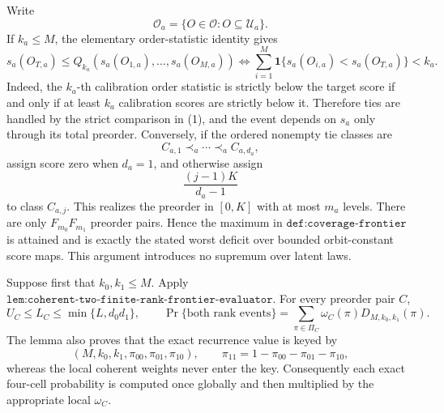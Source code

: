 Write
\[
\mathcal O_a=\{O\in\mathcal O:O\subseteq\mathcal U_a\}.
\]
If \(k_a\le M\), the elementary order-statistic identity gives
\[
s_a(O_{T,a})\le Q_{k_a}(s_a(O_{1,a}),\ldots,s_a(O_{M,a}))
\iff
\sum_{i=1}^M\mathbf 1\{s_a(O_{i,a})<s_a(O_{T,a})\}<k_a.
\tag{1}
\]
Indeed, the \(k_a\)-th calibration order statistic is strictly below the target score if and only if at least \(k_a\) calibration scores are strictly below it. Therefore ties are handled by the strict comparison in (1), and the event depends on \(s_a\) only through its total preorder. Conversely, if the ordered nonempty tie classes are
\[
C_{a,1}\prec_a\cdots\prec_a C_{a,d_a},
\]
assign score zero when \(d_a=1\), and otherwise assign
\[
\frac{(j-1)K}{d_a-1}
\]
to class \(C_{a,j}\). This realizes the preorder in \([0,K]\) with at most \(m_a\) levels. There are only \(F_{m_0}F_{m_1}\) preorder pairs. Hence the maximum in \(\texttt{def:coverage-frontier}\) is attained and is exactly the stated worst deficit over bounded orbit-constant score maps. This argument introduces no supremum over latent laws.

Suppose first that \(k_0,k_1\le M\). Apply \(\texttt{lem:coherent-two-finite-rank-frontier-evaluator}\). For every preorder pair \(C\),
\[
U_C\le L_C\le\min\{L,d_0d_1\},
\qquad
\Pr\{\text{both rank events}\}
 =\sum_{\pi\in\Pi_C}\omega_C(\pi)D_{M,k_0,k_1}(\pi).
\tag{2}
\]
The lemma also proves that the exact recurrence value is keyed by
\[
(M,k_0,k_1,\pi_{00},\pi_{01},\pi_{10}),
\qquad
\pi_{11}=1-\pi_{00}-\pi_{01}-\pi_{10},
\tag{3}
\]
whereas the local coherent weights never enter the key. Consequently each exact four-cell probability is computed once globally and then multiplied by the appropriate local \(\omega_C\).


